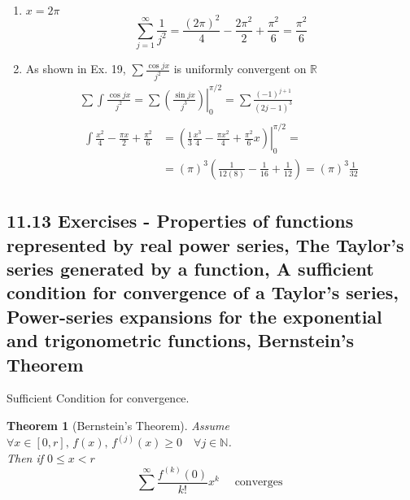 \documentclass[twoside]{amsart}
\theoremstyle{plain}
\newtheorem{theorem}{Theorem}
\theoremstyle{definition}
\begin{document}
\begin{enumerate}
\item $x = 2 \pi$ \\
  \[
  \sum_{j=1}^{\infty} \frac{1}{j^2} = \frac{ (2\pi)^2 }{4} - \frac{ 2 \pi^2}{2} + \frac{ \pi^2}{6} = \frac{ \pi^2}{6 }
\]
\item As shown in Ex. 19, $\sum \frac{ \cos{ jx}}{ j^2} $ is uniformly convergent on $\mathbb{R}$ 
\[
\begin{gathered}
  \sum \int \frac{ \cos{jx}}{ j^2} = \sum \left. \left( \frac{ \sin{jx}}{ j^3} \right) \right|_0^{\pi/2} = \sum \frac{ (-1)^{j+1} }{ (2j-1)^3 } \\
\begin{aligned}
  \int \frac{ x^2}{4} - \frac{ \pi x }{2 } + \frac{ \pi^2}{6} & = \left. \left( \frac{ 1}{3} \frac{ x^3}{4}  - \frac{ \pi x^2}{ 4 } + \frac{ \pi^2}{6} x \right) \right|_0^{\pi/2} =  \\
  & = (\pi)^3 \left( \frac{1}{ 12 (8) } - \frac{1}{16} + \frac{1}{12} \right) = \boxed{ (\pi)^3\frac{1}{32} }
\end{aligned}
\end{gathered}
\]
\end{enumerate}

\subsection*{ 11.13 Exercises - Properties of functions represented by real power series, The Taylor's series generated by a function, A sufficient condition for convergence of a Taylor's series, Power-series expansions for the exponential and trigonometric functions, Bernstein's Theorem }

Sufficient Condition for convergence.  
\begin{theorem}[Bernstein's Theorem]
Assume $\forall x \in [0,r], \, f(x), \, f^{(j)}(x) \geq 0 \quad \forall j \in \mathbb{N}$.  \\
Then if $0 \leq x < r$
\begin{equation}
\sum^{\infty} \frac{f^{(k)}(0)}{k! }x^k \quad \text{ converges }
\end{equation}
\end{theorem}
\end{document}
